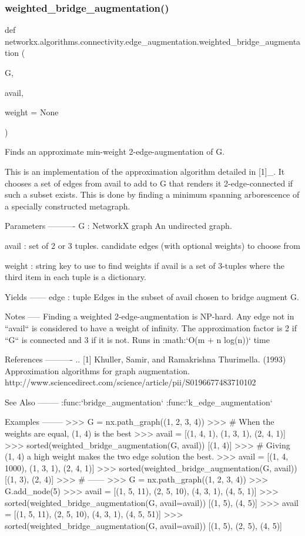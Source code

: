 \subsubsection{\texorpdfstring{weighted\+\_\+bridge\+\_\+augmentation()}{weighted\_bridge\_augmentation()}}
{\footnotesize\ttfamily def networkx.\+algorithms.\+connectivity.\+edge\+\_\+augmentation.\+weighted\+\_\+bridge\+\_\+augmentation (\begin{DoxyParamCaption}\item[{}]{G,  }\item[{}]{avail,  }\item[{}]{weight = {\ttfamily None} }\end{DoxyParamCaption})}

\begin{DoxyVerb}Finds an approximate min-weight 2-edge-augmentation of G.

This is an implementation of the approximation algorithm detailed in [1]_.
It chooses a set of edges from avail to add to G that renders it
2-edge-connected if such a subset exists.  This is done by finding a
minimum spanning arborescence of a specially constructed metagraph.

Parameters
----------
G : NetworkX graph
   An undirected graph.

avail : set of 2 or 3 tuples.
    candidate edges (with optional weights) to choose from

weight : string
    key to use to find weights if avail is a set of 3-tuples where the
    third item in each tuple is a dictionary.

Yields
------
edge : tuple
    Edges in the subset of avail chosen to bridge augment G.

Notes
-----
Finding a weighted 2-edge-augmentation is NP-hard.
Any edge not in ``avail`` is considered to have a weight of infinity.
The approximation factor is 2 if ``G`` is connected and 3 if it is not.
Runs in :math:`O(m + n log(n))` time

References
----------
.. [1] Khuller, Samir, and Ramakrishna Thurimella. (1993) Approximation
    algorithms for graph augmentation.
    http://www.sciencedirect.com/science/article/pii/S0196677483710102

See Also
--------
:func:`bridge_augmentation`
:func:`k_edge_augmentation`

Examples
--------
>>> G = nx.path_graph((1, 2, 3, 4))
>>> # When the weights are equal, (1, 4) is the best
>>> avail = [(1, 4, 1), (1, 3, 1), (2, 4, 1)]
>>> sorted(weighted_bridge_augmentation(G, avail))
[(1, 4)]
>>> # Giving (1, 4) a high weight makes the two edge solution the best.
>>> avail = [(1, 4, 1000), (1, 3, 1), (2, 4, 1)]
>>> sorted(weighted_bridge_augmentation(G, avail))
[(1, 3), (2, 4)]
>>> # ------
>>> G = nx.path_graph((1, 2, 3, 4))
>>> G.add_node(5)
>>> avail = [(1, 5, 11), (2, 5, 10), (4, 3, 1), (4, 5, 1)]
>>> sorted(weighted_bridge_augmentation(G, avail=avail))
[(1, 5), (4, 5)]
>>> avail = [(1, 5, 11), (2, 5, 10), (4, 3, 1), (4, 5, 51)]
>>> sorted(weighted_bridge_augmentation(G, avail=avail))
[(1, 5), (2, 5), (4, 5)]
\end{DoxyVerb}

